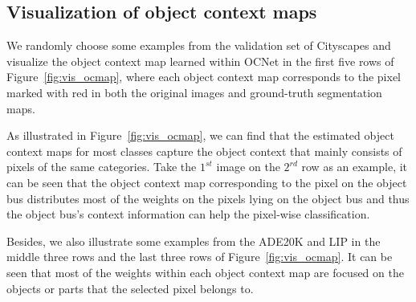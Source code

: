 \documentclass[10pt,twocolumn,letterpaper]{article}
\begin{document}
\subsection{Visualization of object context maps}
We randomly choose some examples from the validation set of Cityscapes
and visualize the object context map learned within OCNet in
the first five rows of Figure~\ref{fig:vis_ocmap},
where each object context map corresponds to the pixel marked with red {}
in both the original images and ground-truth segmentation maps.

As illustrated in Figure~\ref{fig:vis_ocmap},
we can find that the estimated object context maps
for most classes capture the object context
that mainly consists of pixels of the same categories.
Take the $1^{st}$ image on the $2^{rd}$ row as an example, it can be seen that
the object context map corresponding to the pixel on the object bus
distributes most of the weights on the pixels lying
on the object bus and thus the object bus's context information
can help the pixel-wise classification.

Besides, we also illustrate some examples from the ADE20K and LIP
in the middle three rows and the last three rows of Figure~\ref{fig:vis_ocmap}.
It can be seen that most of the weights within each object context map are focused on the
objects or parts that the selected pixel belongs to.


\end{document}
